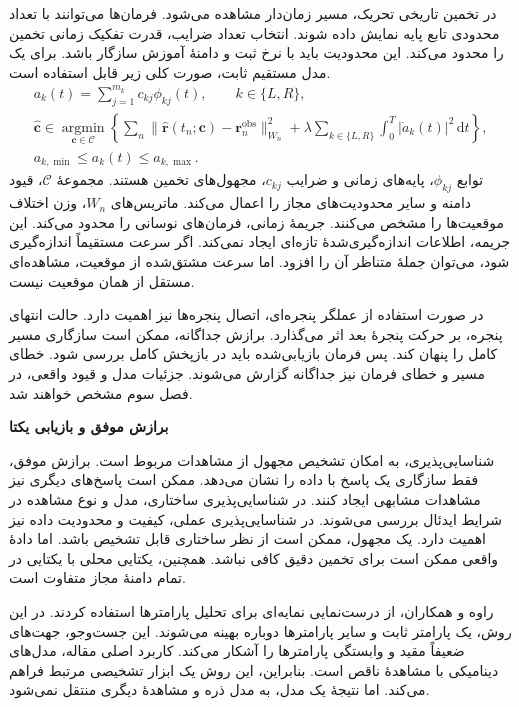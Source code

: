 در تخمین تاریخی تحریک، مسیر زمان‌دار مشاهده می‌شود.
فرمان‌ها می‌توانند با تعداد محدودی تابع پایه نمایش داده شوند.
انتخاب تعداد ضرایب، قدرت تفکیک زمانی تخمین را محدود می‌کند.
این محدودیت باید با نرخ ثبت و دامنهٔ آموزش سازگار باشد.
برای یک مدل مستقیم ثابت، صورت کلی زیر قابل استفاده است.
\begin{equation}
\begin{gathered}
a_k(t)=\sum_{j=1}^{m_k}c_{kj}\phi_{kj}(t),
\qquad k\in\{L,R\},\\
\widehat{\mathbf c}\in
\underset{\mathbf c\in\mathcal C}{\operatorname{argmin}}
\left\{
\sum_n\|\widehat{\mathbf r}(t_n;\mathbf c)
-\mathbf r_n^{\mathrm{obs}}\|_{W_n}^2
+\lambda\sum_{k\in\{L,R\}}\int_0^T|\dot a_k(t)|^2\,\mathrm dt
\right\},\\
a_{k,\min}\le a_k(t)\le a_{k,\max}.
\end{gathered}
\label{eq:lit-magnetic-input-estimation}
\end{equation}
توابع $\phi_{kj}$، پایه‌های زمانی و ضرایب $c_{kj}$، مجهول‌های تخمین هستند.
مجموعهٔ $\mathcal C$، قیود دامنه و سایر محدودیت‌های مجاز را اعمال می‌کند.
ماتریس‌های $W_n$، وزن اختلاف موقعیت‌ها را مشخص می‌کنند.
جریمهٔ زمانی، فرمان‌های نوسانی را محدود می‌کند.
این جریمه، اطلاعات اندازه‌گیری‌شدهٔ تازه‌ای ایجاد نمی‌کند.
اگر سرعت مستقیماً اندازه‌گیری شود، می‌توان جملهٔ متناظر آن را افزود.
اما سرعت مشتق‌شده از موقعیت، مشاهده‌ای مستقل از همان موقعیت نیست.

در صورت استفاده از عملگر پنجره‌ای، اتصال پنجره‌ها نیز اهمیت دارد.
حالت انتهای پنجره، بر حرکت پنجرهٔ بعد اثر می‌گذارد.
برازش جداگانه، ممکن است سازگاری مسیر کامل را پنهان کند.
پس فرمان بازیابی‌شده باید در بازپخش کامل بررسی شود.
خطای مسیر و خطای فرمان نیز جداگانه گزارش می‌شوند.
جزئیات مدل و قیود واقعی، در فصل سوم مشخص خواهند شد.

\label{sec:lit-identifiability-noise-validation}

\textbf{برازش موفق و بازیابی یکتا}

شناسایی‌پذیری، به امکان تشخیص مجهول از مشاهدات مربوط است.
برازش موفق، فقط سازگاری یک پاسخ با داده را نشان می‌دهد.
ممکن است پاسخ‌های دیگری نیز مشاهدات مشابهی ایجاد کنند.
در شناسایی‌پذیری ساختاری، مدل و نوع مشاهده در شرایط ایدئال بررسی می‌شوند.
در شناسایی‌پذیری عملی، کیفیت و محدودیت داده نیز اهمیت دارد.
یک مجهول، ممکن است از نظر ساختاری قابل تشخیص باشد.
اما دادهٔ واقعی ممکن است برای تخمین دقیق کافی نباشد.
همچنین، یکتایی محلی با یکتایی در تمام دامنهٔ مجاز متفاوت است.

راوه و همکاران، از درست‌نمایی نمایه‌ای برای تحلیل پارامترها استفاده کردند.
در این روش، یک پارامتر ثابت و سایر پارامترها دوباره بهینه می‌شوند.
این جست‌وجو، جهت‌های ضعیفاً مقید و وابستگی پارامترها را آشکار می‌کند.
کاربرد اصلی مقاله، مدل‌های دینامیکی با مشاهدهٔ ناقص است.
بنابراین، این روش یک ابزار تشخیصی مرتبط فراهم می‌کند.
اما نتیجهٔ یک مدل، به مدل ذره و مشاهدهٔ دیگری منتقل نمی‌شود.
\cite{Raue2009ProfileLikelihood}


